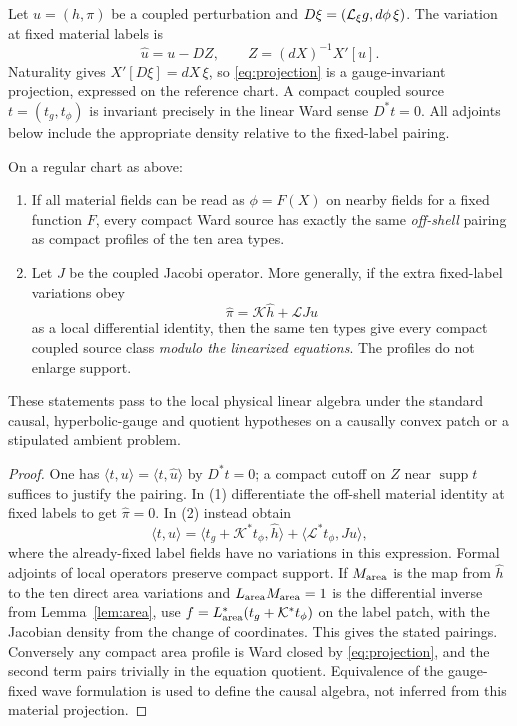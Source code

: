 Let \(u=(h,\pi)\) be a coupled perturbation and \(D\xi=(\mathcal L_\xi g,d\phi\,\xi)\). The variation at fixed material labels is
\begin{equation}\label{eq:projection}
 \widehat u=u-DZ,\qquad Z=(dX)^{-1}X'[u].
\end{equation}
Naturality gives \(X'[D\xi]=dX\,\xi\), so \eqref{eq:projection} is a gauge-invariant projection, expressed on the reference chart. A compact coupled source \(t=(t_g,t_\phi)\) is invariant precisely in the linear Ward sense \(D^*t=0\). All adjoints below include the appropriate density relative to the fixed-label pairing.

\begin{theorem}\label{thm:source}
On a regular chart as above:
\begin{enumerate}
\item If all material fields can be read as \(\phi=F(X)\) on nearby fields for a fixed function \(F\), every compact Ward source has exactly the same \emph{off-shell} pairing as compact profiles of the ten area types.
\item Let \(J\) be the coupled Jacobi operator. More generally, if the extra fixed-label variations obey
\begin{equation}\label{eq:identity}
 \widehat\pi=\mathcal K\widehat h+\mathcal L J u
\end{equation}
as a local differential identity, then the same ten types give every compact coupled source class \emph{modulo the linearized equations}. The profiles do not enlarge support.
\end{enumerate}
These statements pass to the local physical linear algebra under the standard causal, hyperbolic-gauge and quotient hypotheses on a causally convex patch or a stipulated ambient problem.
\end{theorem}
\begin{proof}
One has \(\langle t,u\rangle=\langle t,\widehat u\rangle\) by \(D^*t=0\); a compact cutoff on \(Z\) near \(\operatorname{supp}t\) suffices to justify the pairing. In (1) differentiate the off-shell material identity at fixed labels to get \(\widehat\pi=0\). In (2) instead obtain
\[
 \langle t,u\rangle
 =\langle t_g+\mathcal K^*t_\phi,\widehat h\rangle
     +\langle\mathcal L^*t_\phi,Ju\rangle ,
\]
where the already-fixed label fields have no variations in this expression. Formal adjoints of local operators preserve compact support. If \(M_{\rm area}\) is the map from \(\widehat h\) to the ten direct area variations and \(L_{\rm area}M_{\rm area}=1\) is the differential inverse from Lemma~\ref{lem:area}, use
\(f=L_{\rm area}^*(t_g+\mathcal K^*t_\phi)\) on the label patch, with the Jacobian density from the change of coordinates. This gives the stated pairings. Conversely any compact area profile is Ward closed by \eqref{eq:projection}, and the second term pairs trivially in the equation quotient. Equivalence of the gauge-fixed wave formulation is used to define the causal algebra, not inferred from this material projection.
\end{proof}

